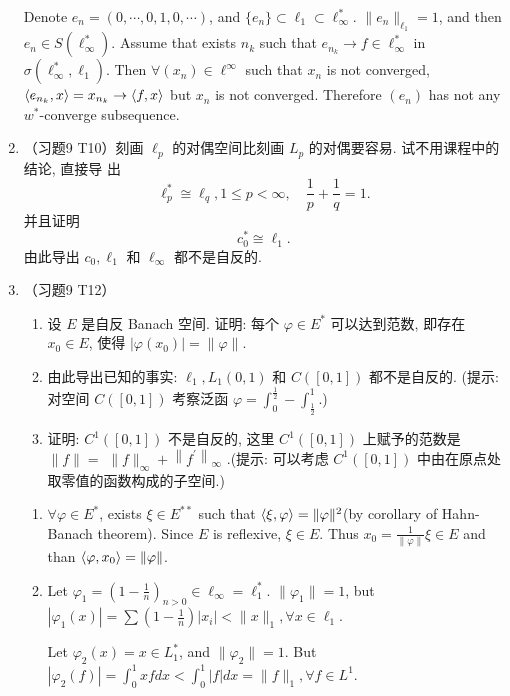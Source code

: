 \begin{enumerate}
\begin{answer}
      Denote $e_n = (0, \cdots, 0, 1, 0, \cdots)$, and $\{e_n\}\subset \ell_1\subset \ell_\infty^*$. $\|e_n\|_{\ell_1} = 1$, and then $e_n\in S(\ell_\infty^*)$. Assume that exists $n_k$ such that $e_{n_k}\to f\in \ell_\infty^*$ in $\sigma(\ell_\infty^*, \ell_1)$. Then $\forall (x_n)\in \ell^\infty$ such that $x_n$ is not converged, $\langle e_{n_k},x\rangle = x_{n_k}\to \langle f,x\rangle$ but $x_n$ is not converged. Therefore $(e_{n})$ has not any $w^*$-converge subsequence.
    \end{answer}
  \item （习题9 T10）刻画 $\ell_{p}$ 的对偶空间比刻画 $L_{p}$ 的对偶要容易. 试不用课程中的结论, 直接导 出
    \[
    \ell_{p}^{*} \cong \ell_{q}, 1 \leqslant p<\infty, \quad \frac{1}{p}+\frac{1}{q}=1 .
    \]
    并且证明
    \[
    c_{0}^{*} \cong \ell_{1} .
    \]
    由此导出 $c_{0}, \ell_{1}$ 和 $\ell_{\infty}$ 都不是自反的.
  \item （习题9 T12）
    \begin{enumerate}
      \item 设 $E$ 是自反 Banach 空间. 证明: 每个 $\varphi \in E^{*}$ 可以达到范数, 即存在 $x_{0} \in E$, 使得 $\left|\varphi\left(x_{0}\right)\right|=\|\varphi\|$.
      \item 由此导出已知的事实: $\ell_{1}, L_{1}(0,1)$ 和 $C([0,1])$ 都不是自反的. (提示: 对空间 $C([0,1])$ 考察泛函 $\varphi=\int_{0}^{\frac{1}{2}}-\int_{\frac{1}{2}}^{1}$.)
      \item 证明: $C^{1}([0,1])$ 不是自反的, 这里 $C^{1}([0,1])$ 上赋予的范数是 $\|f\|=$ $\|f\|_{\infty}+\left\|f^{\prime}\right\|_{\infty}$ .(提示: 可以考虑 $C^{1}([0,1])$ 中由在原点处取零值的函数构成的子空间.)
    \end{enumerate}
    \begin{answer}
      \begin{enumerate}
        \item $\forall \varphi\in E^*$, exists $\xi\in E^{**}$ such that $\langle\xi,\varphi\rangle = \|\varphi\|^2$(by corollary of Hahn-Banach theorem). Since $E$ is reflexive, $\xi\in E$. Thus $x_0 = \frac1{\|\varphi\|}\xi\in E$ and than $\langle\varphi,x_0\rangle = \|\varphi\|$.
        \item Let $\varphi_1=(1-\frac1n)_{n > 0}\in \ell_\infty=\ell_1^*$. $\|\varphi_1\| = 1$, but  $|\varphi_1(x)| = \sum (1 - \frac1n)|x_i| < \|x\|_1, \forall x\in \ell_1$.

        Let $\varphi_2(x) = x \in L_1^*$, and $\|\varphi_2\|=1$. But $|\varphi_2(f)| = \int_0^1 xf dx < \int_0^1 |f|dx = \|f\|_1, \forall f\in L^1$.


\end{enumerate}
\end{answer}
\end{enumerate}
